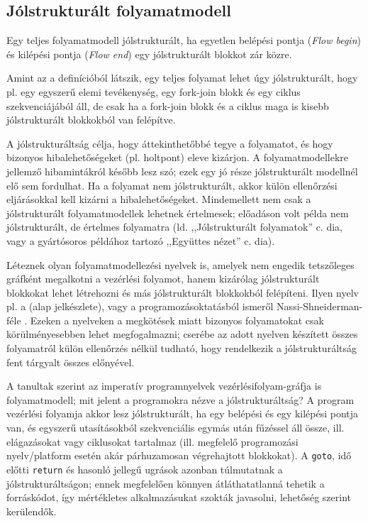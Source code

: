 \subsection{Jólstrukturált folyamatmodell}

Egy teljes folyamatmodell jólstrukturált, ha egyetlen belépési pontja (\emph{Flow begin}) és kilépési pontja (\emph{Flow end}) egy jólstrukturált blokkot zár közre.

Amint az a definícióból látszik, egy teljes folyamat lehet úgy jólstrukturált, hogy pl. egy egyszerű elemi tevékenység, egy fork-join blokk és egy ciklus szekvenciájából áll, de csak ha a fork-join blokk és a ciklus maga is kisebb jólstrukturált blokkokból van felépítve.

A jólstrukturáltság célja, hogy áttekinthetőbbé tegye a folyamatot, és hogy bizonyos hibalehetőségeket (pl. holtpont) eleve kizárjon. A folyamatmodellekre jellemző hibamintákról később lesz szó; ezek egy jó része jólstrukturált modellnél elő sem fordulhat. Ha a folyamat nem jólstrukturált, akkor külön ellenőrzési eljárásokkal kell kizárni a hibalehetőségeket. Mindemellett nem csak a jólstrukturált folyamatmodellek lehetnek értelmesek; előadáson volt példa nem jólstrukturált, de értelmes folyamatra (ld. ,,Jólstrukturált folyamatok'' c. dia, vagy a gyártósoros példához tartozó ,,Együttes nézet'' c. dia).

Léteznek olyan folyamatmodellezési nyelvek is, amelyek nem engedik tetszőleges gráfként megalkotni a vezérlési folyamot, hanem kizárólag jólstrukturált blokkokat lehet létrehozni és más jólstrukturált blokkokból felépíteni. Ilyen nyelv pl. a  (alap jelkészlete), vagy a programozásoktatásból ismeről Nassi-Shneiderman-féle . Ezeken a nyelveken a megkötések miatt bizonyos folyamatokat csak körülményesebben lehet megfogalmazni; cserébe az adott nyelven készített összes folyamatról külön ellenőrzés nélkül tudható, hogy rendelkezik a jólstrukturáltság fent tárgyalt összes előnyével.

A tanultak szerint az imperatív programnyelvek vezérlésifolyam-gráfja is folyamatmodell; mit jelent a programokra nézve a jólstrukturáltság? A program vezérlési folyamja akkor lesz jólstrukturált, ha egy belépési és egy kilépési pontja van, és egyszerű utasításokból szekvenciális egymás után fűzéssel áll össze, ill. elágazásokat vagy ciklusokat tartalmaz (ill. megfelelő programozási nyelv/platform esetén akár párhuzamosan végrehajtott blokkokat). A \lstinline{goto}, idő előtti \lstinline{return} és hasonló jellegű ugrások azonban túlmutatnak a jólstrukturáltságon; ennek megfelelően könnyen átláthatatlanná tehetik a forráskódot, így mértékletes alkalmazásukat szokták javasolni, lehetőség szerint kerülendők.

